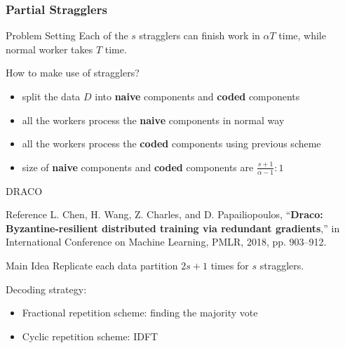 \documentclass{beamer}
\begin{document}
\begin{frame}
    \frametitle{Partial Stragglers}

    \begin{block}{Problem Setting}
        Each of the $s$ stragglers can finish work in $\alpha T$ time, while normal worker takes $T$ time.

        How to make use of stragglers?
    \end{block}

    \begin{solution}
        
        \begin{itemize}
            \item split the data $D$ into \textbf{naive} components and \textbf{coded} components
            \item all the workers process the \textbf{naive} components in normal way
            \item all the workers process the \textbf{coded} components using previous scheme
            \item size of \textbf{naive} components and \textbf{coded} components are $\frac{s + 1}{\alpha - 1} : 1$
        \end{itemize}
    \end{solution}

\end{frame}

\begin{frame}{DRACO}
    \begin{block}{Reference}
        L. Chen, H. Wang, Z. Charles, and D. Papailiopoulos, “\textbf{Draco: Byzantine-resilient distributed training via redundant gradients},” in International Conference on Machine Learning, PMLR, 2018, pp. 903–912.
    \end{block}

    \begin{block}{Main Idea}
        Replicate each data partition $2s+1$ times for $s$ stragglers.

        Decoding strategy:
        \begin{itemize}
            \item Fractional repetition scheme: finding the majority vote
            \item Cyclic repetition scheme: IDFT
        \end{itemize}
    \end{block}

\end{frame}
\end{document}
